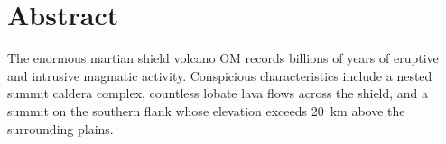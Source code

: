 \chapter{Abstract}
The enormous martian shield volcano \acl{OM} records billions of years of eruptive and intrusive magmatic activity. Conspicious characteristics include a nested summit caldera complex, countless lobate lava flows across the shield, and a summit on the southern flank whose elevation exceeds \qty{20}{\km} above the surrounding plains.